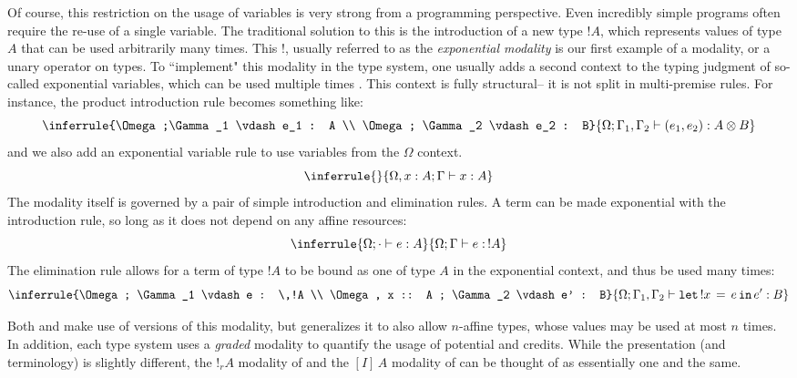 Of course, this restriction on the usage of variables is very strong from a programming perspective. Even incredibly simple programs often require the re-use of a single variable. The traditional solution to this is the introduction of a new type $!A$, which represents values of type $A$ that can be used arbitrarily many times. This $!$, usually referred to as the \textit{exponential modality} is our first example of a modality, or a unary operator on types. To ``implement" this modality in the type system, one usually adds a second context to the typing judgment of so-called exponential variables, which can be used multiple times \citehere. This context is fully structural-- it is not split in multi-premise rules. For instance, the product introduction rule becomes something like:
$$
\inferrule{\Omega;\Gamma_1 \vdash e_1 : A \\ \Omega; \Gamma_2 \vdash e_2 : B}{\Omega; \Gamma_1,\Gamma_2 \vdash (e_1,e_2) : A \otimes B}
$$
and we also add an exponential variable rule to use variables from the $\Omega$ context.
$$
\inferrule{ }{\Omega, x : A; \Gamma \vdash x : A}
$$
The modality itself is governed by a pair of simple introduction and elimination rules. A term can be made exponential with the introduction rule, so long as it does not depend on any affine resources:
$$
\inferrule{\Omega ; \cdot \vdash e : A}{\Omega ; \Gamma \vdash e : \, !A}
$$
The elimination rule allows for a term of type $!A$ to be bound as one of type $A$ in the exponential context, and thus be used many times:
$$
\inferrule{\Omega ; \Gamma_1 \vdash e : \,!A \\ \Omega, x :: A ; \Gamma_2 \vdash e' : B}{\Omega ; \Gamma_1,\Gamma_2 \vdash \texttt{let} \, !x \, = \, e \,\texttt{in}\, e' : B}
$$

Both \lambdaA and \lambdaamor make use of versions of this modality, but \lambdaA generalizes it to also allow $n$-affine types, whose values may be used at most $n$ times. In addition, each type system uses a \textit{graded} modality to quantify the usage of potential and credits. While the presentation (and terminology) is slightly different, the $!_r A$ modality of \lambdaA and the $[I] \, A$ modality of \lambdaamor can be thought of as essentially one and the same. 